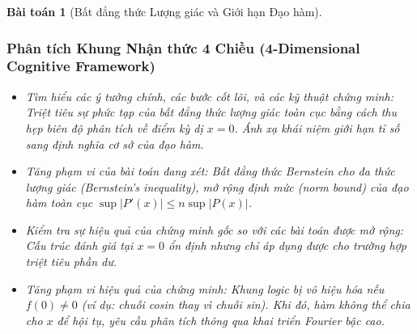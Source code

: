 \documentclass{article}
\newtheorem{baitoan}{Bài toán}
\begin{document}
\begin{baitoan}[Bất đẳng thức Lượng giác và Giới hạn Đạo hàm]
 \subsubsection*{Phân tích Khung Nhận thức 4 Chiều (4-Dimensional Cognitive Framework)}
 \begin{itemize}
 \item \textit{Tìm hiểu các ý tưởng chính, các bước cốt lõi, và các kỹ thuật chứng minh}: Triệt tiêu sự phức tạp của bất đẳng thức lượng giác toàn cục bằng cách thu hẹp biên độ phân tích về điểm kỳ dị $x=0$. Ánh xạ khái niệm giới hạn tỉ số sang định nghĩa cơ sở của đạo hàm.
 \item \textit{Tăng phạm vi của bài toán đang xét}: Bất đẳng thức Bernstein cho đa thức lượng giác (Bernstein's inequality), mở rộng định mức (norm bound) của đạo hàm toàn cục $\sup |P'(x)| \le n \sup |P(x)|$.
 \item \textit{Kiểm tra sự hiệu quả của chứng minh gốc so với các bài toán được mở rộng}: Cấu trúc đánh giá tại $x=0$ ổn định nhưng chỉ áp dụng được cho trường hợp triệt tiêu phần dư.
 \item \textit{Tăng phạm vi hiệu quả của chứng minh}: Khung logic bị vô hiệu hóa nếu $f(0) \neq 0$ (ví dụ: chuỗi cosin thay vì chuỗi sin). Khi đó, hàm không thể chia cho $x$ để hội tụ, yêu cầu phân tích thông qua khai triển Fourier bậc cao.
 \end{itemize}
\end{baitoan}

\end{document}
